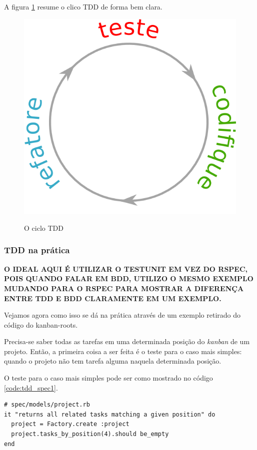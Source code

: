 A figura \ref{img:ciclo-tdd} resume o clico TDD de forma bem clara.

\begin{figure}[h]
  \center
  \caption{O ciclo TDD}
  \includegraphics[scale=0.45]{images/ciclo-tdd}
  \label{img:ciclo-tdd}
\end{figure}

\subsubsection{TDD na prática}
\label{ssub:tdd_na_pratica}

\textbf{O IDEAL AQUI É UTILIZAR O TESTUNIT EM VEZ DO RSPEC, POIS QUANDO FALAR EM BDD, UTILIZO O MESMO EXEMPLO MUDANDO PARA O RSPEC PARA MOSTRAR A DIFERENÇA ENTRE TDD E BDD CLARAMENTE EM UM EXEMPLO.}

Vejamos agora como isso se dá na prática através de um exemplo retirado do código do kanban-roots.

Precisa-se saber todas as tarefas em uma determinada posição do \textit{kanban} de um projeto. Então, a primeira coisa a ser feita é o teste para o caso mais simples: quando o projeto não tem tarefa alguma naquela determinada posição.

O teste para o caso mais simples pode ser como mostrado no código \ref{code:tdd_spec1}.

\begin{lstlisting}[caption=Teste para o método Project\#tasks\_by\_position (versão 1),label=code:tdd_spec1]
# spec/models/project.rb
it "returns all related tasks matching a given position" do
  project = Factory.create :project
  project.tasks_by_position(4).should be_empty
end
\end{lstlisting}

